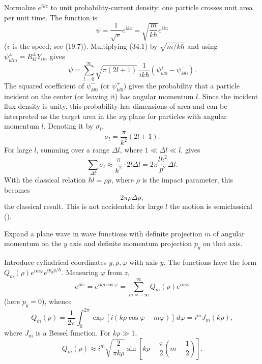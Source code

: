 Normalize $e^{ikz}$ to unit probability-current density: one particle crosses
unit area per unit time. The function is
\begin{equation}
 \psi=\frac1{\sqrt v}e^{ikz}=\sqrt{\frac m{k\hbar}}e^{ikz}
 \tag{34.4}
\end{equation}
($v$ is the speed; see (19.7)). Multiplying (34.1) by $\sqrt{m/k\hbar}$ and
using $\psi_{klm}^{\pm}=R_{kl}^{\pm}Y_{lm}$ gives
\[
 \psi=\sum_{l=0}^{\infty}\sqrt{\pi(2l+1)}\,
 \frac1{ik\hbar}(\psi_{kl0}^{+}-\psi_{kl0}^{-}).
\]
The squared coefficient of $\psi_{kl0}^{-}$ (or $\psi_{kl0}^{+}$) gives the
probability that a particle incident on the center (or leaving it) has angular
momentum $l$. Since the incident flux density is unity, this probability has
dimensions of area and can be interpreted as the target area in the $xy$
plane for particles with angular momentum $l$. Denoting it by $\sigma_l$,
\begin{equation}
 \sigma_l=\frac\pi{k^2}(2l+1).
 \tag{34.5}
\end{equation}
For large $l$, summing over a range $\Delta l$, where
$1\ll\Delta l\ll l$, gives
\[
 \sum_{\Delta l}\sigma_l\approx\frac\pi{k^2}\cdot2l\Delta l
 =2\pi\frac{l\hbar^2}{p^2}\Delta l.
\]
With the classical relation $\hbar l=\rho p$, where $\rho$ is the impact
parameter, this becomes
\[
 2\pi\rho\Delta\rho,
\]
the classical result. This is not accidental: for large $l$ the motion is
semiclassical ().

\ProblemHeading{} Expand a plane wave in wave functions with definite
projection $m$ of angular momentum on the $y$ axis and definite momentum
projection $p_y$ on that axis.

\SolutionHeading{} Introduce cylindrical coordinates $y,\rho,\varphi$ with
axis $y$. The functions have the form
$Q_m(\rho)e^{im\varphi}e^{ip_yy/\hbar}$. Measuring $\varphi$ from $z$,
\[
 e^{ikz}=e^{ik\rho\cos\varphi}
 =\sum_{m=-\infty}^{\infty}Q_m(\rho)e^{im\varphi}
\]
(here $p_y=0$), whence
\[
 Q_m(\rho)=\frac1{2\pi}\int_0^{2\pi}
 \exp[i(k\rho\cos\varphi-m\varphi)]\,d\varphi=i^mJ_m(k\rho),
\]
where $J_m$ is a Bessel function. For $k\rho\gg1$,
\[
 Q_m(\rho)\approx i^m\sqrt{\frac2{\pi k\rho}}
 \sin\left[k\rho-\frac\pi2\left(m-\frac12\right)\right].
\]
